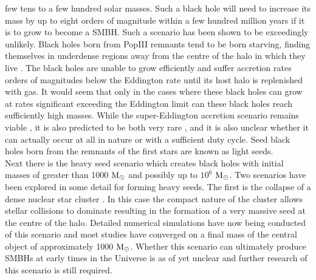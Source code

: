 \documentclass[graphics, twocolumn, usenatbib]{mn2e}
\newcommand{\msolar} {$\rm{M_{\odot}}~$}
\newcommand{\msolarc} {$\rm{M_{\odot}}$}
\begin{document}
few tens to a few hundred solar masses. Such a black hole will need to increase its mass by up to
eight orders of magnitude within a few hundred million years if it is to grow to become a SMBH. Such
a scenario has been shown to be exceedingly unlikely. Black holes born from PopIII remnants tend to
be born starving, finding themselves in underdense regions away from the centre of the halo in
which they live \citep{Whalen_2004, Milosavljevic_2009, Alvarez_2009, Smith_2018}. The black holes
are unable to grow efficiently and suffer accretion rates orders of magnitudes below the Eddington
rate until its host halo is replenished with gas. It would seem that only in the cases where these 
black holes can grow at rates significant
exceeding the Eddington limit can these black holes reach sufficiently high masses. While the
super-Eddington accretion scenario remains viable \citep{Madau_2001, Madau_2014, Alexander_2014,
  Lupi_2016}, it is also predicted to be both very rare \citep{Pacucci_2017}, and it is also unclear
whether it can actually occur at all in nature or with a sufficient duty cycle. Seed black holes born
from the remnants of the first stars are known as light seeds.\\
\indent Next there is the heavy seed scenario which creates black holes with initial masses of
greater than 1000 \msolar and possibly up to $10^{6}$ \msolarc. Two scenarios have been
explored in some detail for forming heavy seeds. The first is the collapse of a dense
nuclear star cluster \citep{PortegiesZwart_2004, Freitag_2008, Devecchi_2008, Merritt_2008,
  Davies_2011, Lupi_2014}. In this case the compact nature of the cluster allows
stellar collisions to dominate resulting in the formation of a very massive seed at the
centre of the halo. Detailed numerical simulations have now being conducted \cite[e.g.][]{Katz_2015,
  Reinoso_2018} of this scenario and
most studies have converged on a final mass of the central object of approximately 1000 \msolarc.
Whether this scenario can ultimately produce SMBHs at early times in the Universe is as of yet
unclear and further research of this scenario is still required. \\
\end{document}
